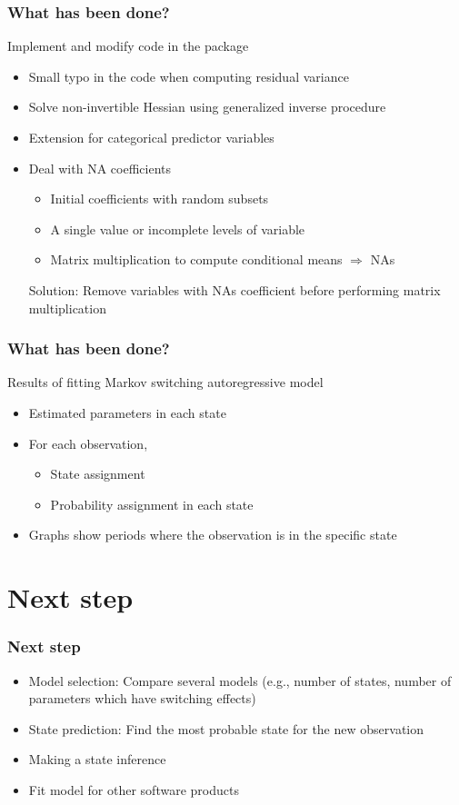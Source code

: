 \documentclass{beamer}
\begin{document}
\begin{frame}
\frametitle{What has been done?}
Implement and modify code in the package
\begin{itemize}
	\item Small typo in the code when computing residual variance
	\item Solve non-invertible Hessian using generalized inverse procedure \cite{p2}
	\item Extension for categorical predictor variables
	\item Deal with NA coefficients
	\begin{itemize}
		\item Initial coefficients with random subsets
		\item A single value or incomplete levels of variable
		\item Matrix multiplication to compute conditional means $\Rightarrow$ NAs
	\end{itemize}
	Solution: Remove variables with NAs coefficient before performing matrix multiplication
	
\end{itemize}
\end{frame}

\begin{frame}
\frametitle{What has been done?}
Results of fitting Markov switching autoregressive model
\begin{itemize}
	\item Estimated parameters in each state
	\item For each observation,
	\begin{itemize}
		\item State assignment
		\item Probability assignment in each state
	\end{itemize}
	
	\item Graphs show periods where the observation is in the specific state
\end{itemize}

\end{frame}

\section{Next step}
\begin{frame}
\frametitle{Next step}
\begin{itemize}
	\item Model selection: Compare several models (e.g., number of states, number of parameters which have switching effects)
	\item State prediction: Find the most probable state for the new observation
	\item Making a state inference
	\item Fit model for other software products

\end{itemize}
\end{frame}
\end{document}
